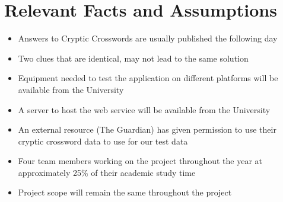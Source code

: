 \section{Relevant Facts and Assumptions}

\begin{itemize}
  \item Answers to Cryptic Crosswords are usually published the following day
  \item Two clues that are identical, may not lead to the same solution
  \item Equipment needed to test the application on different platforms will be
        available from the University
  \item A server to host the web service will be available from the University
  \item An external resource (The Guardian) has given permission to use their 
        cryptic crossword data to use for our test data
  \item Four team members working on the project throughout the year at 
        approximately 25\% of their academic study time
  \item Project scope will remain the same throughout the project
\end{itemize}